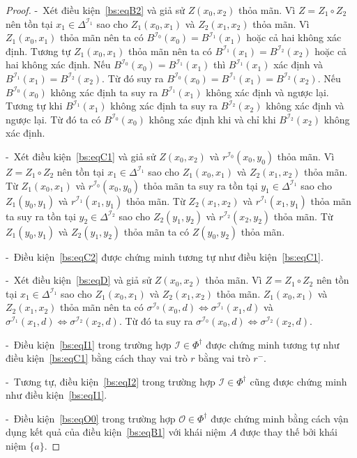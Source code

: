 \documentclass[12pt,a4paper,twoside]{report}
\newcommand{\mI}		{\mathcal{I}}
\newcommand{\mO}		{\mathcal{O}}
\newcommand{\PhiDag}	{\Phi^\dag}
\newcommand{\semiItem}	{\mbox{- }}
\theoremstyle{definition}
\begin{document}
\begin{proof}
\semiItem Xét điều kiện~\eqref{bs:eqB2} và giả sử $Z(x_0, x_2)$ thỏa mãn. Vì $Z = Z_1 \circ Z_2$ nên tồn tại $x_1 \in \Delta^{\mI_1}$ sao cho $Z_1(x_0, x_1)$ và $Z_2(x_1, x_2)$ thỏa mãn. Vì $Z_1(x_0,x_1)$ thỏa mãn nên ta có $B^{\mI_0}(x_0) = B^{\mI_1}(x_1)$ hoặc cả hai không xác định. Tương tự $Z_1(x_0,x_1)$ thỏa mãn nên ta có $B^{\mI_1}(x_1) = B^{\mI_2}(x_2)$ hoặc cả hai không xác định. 
Nếu $B^{\mI_0}(x_0) = B^{\mI_1}(x_1)$ thì $B^{\mI_1}(x_1)$ xác định và $B^{\mI_1}(x_1) = B^{\mI_2}(x_2)$. Từ đó suy ra $B^{\mI_0}(x_0) = B^{\mI_1}(x_1) = B^{\mI_2}(x_2)$.
%
Nếu $B^{\mI_0}(x_0)$ không xác định ta suy ra  $B^{\mI_1}(x_1)$ không xác định và ngược lại. Tương tự khi $B^{\mI_1}(x_1)$ không xác định ta suy ra  $B^{\mI_2}(x_2)$ không xác định và ngược lại. Từ đó ta có $B^{\mI_0}(x_0)$ không xác định khi và chỉ khi $B^{\mI_2}(x_2)$ không xác định.

\semiItem Xét điều kiện~\eqref{bs:eqC1} và giả sử $Z(x_0, x_2)$ và $r^{\mI_0}(x_0, y_0)$ thỏa mãn. Vì $Z = Z_1 \circ Z_2$ nên tồn tại $x_1 \in \Delta^{\mI_1}$ sao cho $Z_1(x_0,x_1)$ và $Z_2(x_1,x_2)$ thỏa mãn. Từ $Z_1(x_0,x_1)$ và $r^{\mI_0}(x_0, y_0)$ thỏa mãn ta suy ra tồn tại $y_1 \in \Delta^{\mI_1}$ sao cho $Z_1(y_0, y_1)$ và $r^{\mI_1}(x_1, y_1)$ thỏa mãn. Từ $Z_2(x_1,x_2)$ và $r^{\mI_1}(x_1, y_1)$ thỏa mãn ta suy ra tồn tại $y_2 \in \Delta^{\mI_2}$ sao cho $Z_2(y_1, y_2)$ và $r^{\mI_2}(x_2, y_2)$ thỏa mãn. Từ $Z_1(y_0,y_1)$ và $Z_2(y_1,y_2)$ thỏa mãn ta có $Z(y_0,y_2)$ thỏa mãn.

\semiItem Điều kiện~\eqref{bs:eqC2} được chứng minh tương tự như điều kiện~\eqref{bs:eqC1}.

\semiItem Xét điều kiện~\eqref{bs:eqD} và giả sử $Z(x_0,x_2)$ thỏa mãn. Vì $Z = Z_1 \circ Z_2$ nên tồn tại $x_1 \in \Delta^{\mI_1}$ sao cho $Z_1(x_0,x_1)$ và $Z_2(x_1, x_2)$ thỏa mãn. $Z_1(x_0,x_1)$ và $Z_2(x_1,x_2)$ thỏa mãn nên ta có $\sigma^{\mI_0}(x_0, d) \Leftrightarrow \sigma^{\mI_1}(x_1,d)$ và $\sigma^{\mI_1}(x_1, d) \Leftrightarrow \sigma^{\mI_2}(x_2,d)$. Từ đó ta suy ra $\sigma^{\mI_0}(x_0, d) \Leftrightarrow \sigma^{\mI_2}(x_2,d)$.

\semiItem Điều kiện~\eqref{bs:eqI1} trong trường hợp $\mI \in \PhiDag$ được chứng minh tương tự như điều kiện~\eqref{bs:eqC1} bằng cách thay vai trò $r$ bằng vai trò $r^-$.

\semiItem Tương tự, điều kiện~\eqref{bs:eqI2} trong trường hợp $\mI \in \PhiDag$ cũng được chứng minh như điều kiện~\eqref{bs:eqI1}.

\semiItem Điều kiện~\eqref{bs:eqO0} trong trường hợp $\mO \in \PhiDag$ được chứng minh bằng cách vận dụng kết quả của điều kiện~\eqref{bs:eqB1} với khái niệm $A$ được thay thế bởi khái niệm $\{a\}$.


\end{proof}
\end{document}
